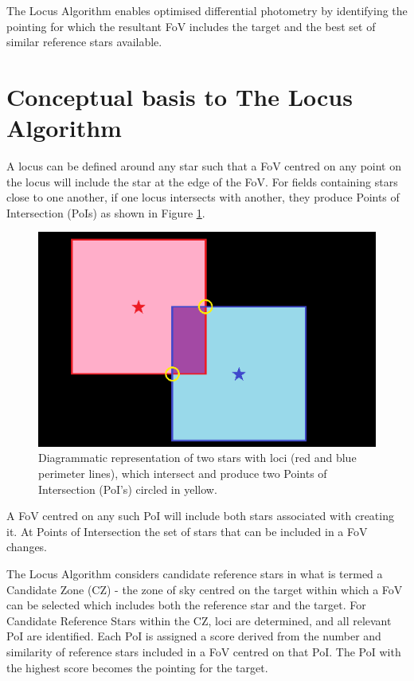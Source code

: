 \documentclass[]{elsarticle} %
\makeatletter
\def\maxwidth{\ifdim\Gin@nat@width>\linewidth\linewidth
\else\Gin@nat@width\fi}
\let\Oldincludegraphics\includegraphics
\renewcommand{\includegraphics}[1]{\Oldincludegraphics[width=\maxwidth]{#1}}
\makeatother
\begin{document}
The Locus Algorithm enables optimised differential photometry by
identifying the pointing for which the resultant FoV includes the target
and the best set of similar reference stars available.

\hypertarget{conceptual-basis-to-the-locus-algorithm}{%
\section{Conceptual basis to The Locus
Algorithm}\label{conceptual-basis-to-the-locus-algorithm}}

A locus can be defined around any star such that a FoV centred on any
point on the locus will include the star at the edge of the FoV. For
fields containing stars close to one another, if one locus intersects
with another, they produce Points of Intersection (PoIs) as shown in Figure \ref{loci_concept}.

\begin{figure}
\centering
\includegraphics{fig1.png}
\caption{\label{loci_concept}Diagrammatic representation of two stars with loci
(red and blue perimeter lines), which intersect and produce two Points
of Intersection (PoI's) circled in yellow.}
\end{figure}

A FoV centred on any such PoI will include both stars associated with
creating it. At Points of Intersection the set of stars that can be
included in a FoV changes.

The Locus Algorithm considers candidate reference stars in what is
termed a Candidate Zone (CZ) - the zone of sky centred on the target
within which a FoV can be selected which includes both the reference
star and the target. For Candidate Reference Stars within the CZ, 
loci are determined, and all relevant PoI are identified. Each PoI 
is assigned a score derived from the number and similarity of reference
stars included in a FoV centred on that PoI. The PoI with the highest score 
becomes the pointing for the target.
\end{document}
